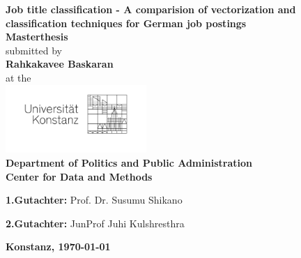 \documentclass[12pt, a4paper, titlepage]{article}
\begin{document}
\begin{titlepage}
    \begin{center}
    {\LARGE \textbf{Job title classification - A comparision of vectorization and classification techniques for German job postings}}
    \\[1cm]
    {\Large \textbf{Masterthesis}}
    \\[1cm]
    {\Large submitted by}
    \\[0.5cm]
    {\LARGE \textbf{Rahkakavee Baskaran}}
    \\[0.5cm]
    {\Large at the}
    \\[0.5cm]
    \includegraphics[width=0.4\textwidth]{logo.jpg}
    \\[1cm]
    {\Large \textbf{Department of Politics and Public Administration}}
    \\[1cm]
    {\Large \textbf{Center for Data and Methods}}
    \\[2cm]
    \begin{minipage}[c]{0.8\textwidth}
    \begin{description}
     \item {\Large \textbf{1.Gutachter:} Prof. Dr. Susumu Shikano}
     \item {\Large \textbf{2.Gutachter:} JunProf Juhi Kulshresthra}
    \end{description}
    \end{minipage}
    \vfill
    {\LARGE \textbf{Konstanz, \today}}
    \end{center}
    \end{titlepage}

\tableofcontents
\newpage
\listoffigures
\newpage
\listoftables
\newpage
\end{document}
